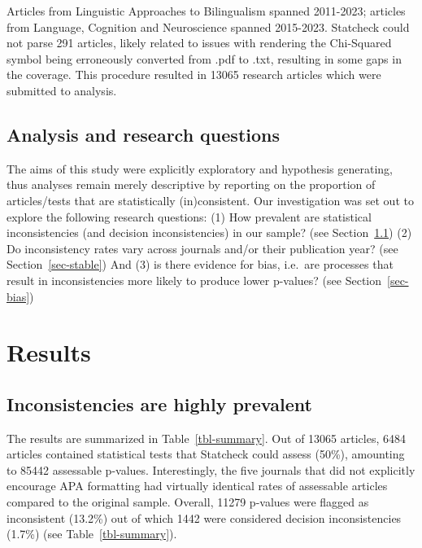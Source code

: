\documentclass[
  doc,
  longtable,
  nolmodern,
  notxfonts,
  notimes,
  colorlinks=true,linkcolor=blue,citecolor=blue,urlcolor=blue]{apa7}
\begin{document}
Articles from Linguistic Approaches to Bilingualism spanned 2011-2023;
articles from Language, Cognition and Neuroscience spanned 2015-2023.
Statcheck could not parse 291 articles, likely related to issues with
rendering the Chi-Squared symbol being erroneously converted from .pdf
to .txt, resulting in some gaps in the coverage. This procedure resulted
in 13065 research articles which were submitted to analysis.

\subsection{Analysis and research
questions}\label{analysis-and-research-questions}

The aims of this study were explicitly exploratory and hypothesis
generating, thus analyses remain merely descriptive by reporting on the
proportion of articles/tests that are statistically (in)consistent. Our
investigation was set out to explore the following research questions:
(1) How prevalent are statistical inconsistencies (and decision
inconsistencies) in our sample? (see Section~\ref{sec-prevalent}) (2) Do
inconsistency rates vary across journals and/or their publication year?
(see Section~\ref{sec-stable}) And (3) is there evidence for bias,
i.e.~are processes that result in inconsistencies more likely to produce
lower p-values? (see Section~\ref{sec-bias})

\section{Results}\label{results}

\subsection{Inconsistencies are highly prevalent}\label{sec-prevalent}

The results are summarized in Table~\ref{tbl-summary}. Out of 13065
articles, 6484 articles contained statistical tests that Statcheck could
assess (50\%), amounting to 85442 assessable p-values. Interestingly,
the five journals that did not explicitly encourage APA formatting had
virtually identical rates of assessable articles compared to the
original sample. Overall, 11279 p-values were flagged as inconsistent
(13.2\%) out of which 1442 were considered decision inconsistencies
(1.7\%) (see Table~\ref{tbl-summary}).
\end{document}
